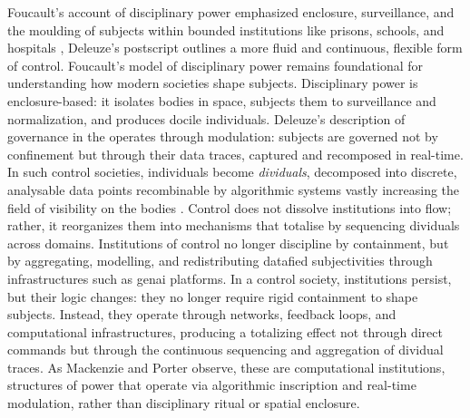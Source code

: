 Foucault’s account of disciplinary power emphasized enclosure, surveillance, and the moulding of subjects within bounded institutions like prisons, schools, and hospitals \parencite{foucault2008}, Deleuze's postscript outlines a more fluid and continuous, flexible form of control. Foucault’s model of disciplinary power remains foundational for understanding how modern societies shape subjects. Disciplinary power is enclosure-based: it isolates bodies in space, subjects them to surveillance and normalization, and produces docile individuals. Deleuze's description of governance in the  operates through modulation: subjects are governed not by confinement but through their data traces, captured and recomposed in real-time.
In such control societies, individuals become \emph{dividuals}, decomposed into discrete, analysable data points recombinable by algorithmic systems \parencite{mackenzie2021} vastly increasing the field of visibility on the bodies \parencite{foucault2008}. Control does not dissolve institutions into flow; rather, it reorganizes them into mechanisms that totalise by sequencing dividuals across domains. Institutions of control no longer discipline by containment, but by aggregating, modelling, and redistributing datafied subjectivities through infrastructures such as \gls{genai} platforms. In a control society, institutions persist, but their logic changes: they no longer require rigid containment to shape subjects. Instead, they operate through networks, feedback loops, and computational infrastructures, producing a totalizing effect not through direct commands but through the continuous sequencing and aggregation of dividual traces. As Mackenzie and Porter \parencite*[]{mackenzie2021} observe, these are computational institutions, structures of power that operate via algorithmic inscription and real-time modulation, rather than disciplinary ritual or spatial enclosure.



